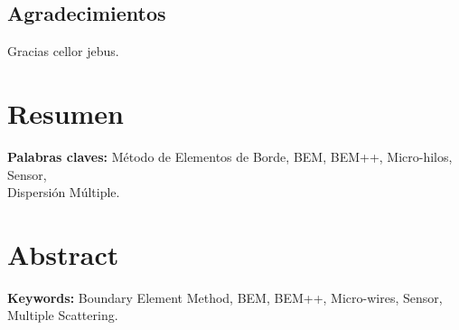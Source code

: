 \documentclass[11pt]{article}
\begin{document}
\begin{center}
	\section*{Agradecimientos}

Gracias cellor jebus.

\end{center}


\pagebreak
\section*{Resumen}
\noindent\textbf{Palabras claves:} Método de Elementos de Borde, BEM, BEM++, Micro-hilos, Sensor,\\ Dispersión Múltiple.
\pagebreak
\section*{Abstract}

\noindent\textbf{Keywords:} Boundary Element Method, BEM, BEM++, Micro-wires, Sensor,\\ Multiple Scattering.
\pagebreak
\end{document}
